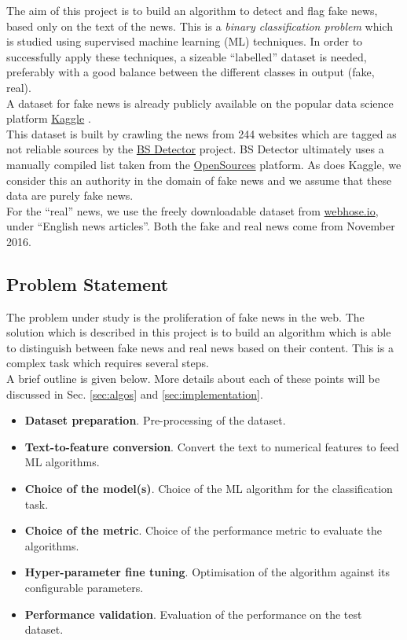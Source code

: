 \documentclass[a4paper,12pt]{article} %
\begin{document}
The aim of this project is to build an algorithm to detect and flag fake news,
based only on the text of the news. This is a \textit{binary classification problem} which
is studied using supervised machine learning (ML) techniques.
In order to successfully apply these techniques,
a sizeable ``labelled'' dataset is needed, preferably with a good balance
between the different classes in output (fake, real). \\
A dataset for fake news is already
publicly available on the popular data science platform
\href{https://www.kaggle.com}{Kaggle} \cite{KaggleDataset}. \\
This dataset is built by crawling the news from 244 websites which are
tagged as not reliable sources by the
\href{https://github.com/selfagency/bs-detector}{BS Detector} project.
BS Detector ultimately uses a manually compiled list taken
from the \href{http://www.opensources.co/}{OpenSources} platform.
As does Kaggle, we consider this an authority in the domain of fake
news and we assume that these data are purely fake news. \\
For the ``real'' news, we use the freely downloadable dataset from
\href{https://webhose.io/datasets}{webhose.io}, under ``English news
articles''.
Both the fake and real news come from November 2016.


\subsection{Problem Statement}
\label{sec:problem_statement}
The problem under study is the proliferation of fake news in the web.
The solution which is described in this project is to build
an algorithm which is able to distinguish between fake news
and real news based on their content.
This is a complex task which requires several steps. \\
A brief outline is given below.
More details about each of these points will be discussed in Sec. \ref{sec:algos} and \ref{sec:implementation}.
\begin{itemize}
\item \textbf{Dataset preparation}.
Pre-processing of the dataset.
\item \textbf{Text-to-feature conversion}.
Convert the text to numerical features to feed ML algorithms.
\item \textbf{Choice of the model(s)}.
Choice of the ML algorithm for the classification task.
\item \textbf{Choice of the metric}.
Choice of the performance metric to evaluate the algorithms.
\item \textbf{Hyper-parameter fine tuning}.
Optimisation of the algorithm against its configurable parameters.
\item \textbf{Performance validation}.
Evaluation of the performance on the test dataset.
\end{itemize}
\end{document}
